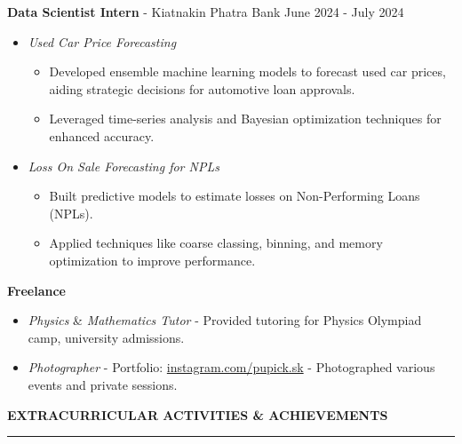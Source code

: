 \documentclass[a4paper, 11pt]{article}
\begin{document}
\textbf{Data Scientist Intern} - Kiatnakin Phatra Bank \hfill June 2024 - July 2024

\begin{itemize}[topsep=0pt, parsep=0pt]
    \item \textit{Used Car Price Forecasting}
    {\fontsize{11pt}{11pt}\selectfont
    \begin{itemize}[noitemsep, topsep=0pt, partopsep=0pt, parsep=0pt, leftmargin=*]
        \item Developed ensemble machine learning models to forecast used car prices, aiding strategic decisions for automotive loan approvals.
        \item Leveraged time-series analysis and Bayesian optimization techniques for enhanced accuracy.
    \end{itemize}
    }
    \item \textit{Loss On Sale Forecasting for NPLs}
    {\fontsize{11pt}{11pt}\selectfont
    \begin{itemize}[noitemsep, topsep=0pt, partopsep=0pt, parsep=0pt, leftmargin=*]
        \item Built predictive models to estimate losses on Non-Performing Loans (NPLs).%
        \item Applied techniques like coarse classing, binning, and memory optimization to improve performance.
    \end{itemize}
    }
\end{itemize}

\textbf{Freelance}
\begin{itemize}[noitemsep, topsep=0pt, partopsep=0pt, parsep=0pt]
    \item \textit{Physics} \& \textit{Mathematics Tutor} - Provided tutoring for Physics Olympiad camp, university admissions.
    \item \textit{Photographer} - Portfolio: \href{https://www.instagram.com/pupick.sk/}{instagram.com/pupick.sk} - Photographed various events and private sessions.
\end{itemize}

\vspace{6pt}
\textbf{EXTRACURRICULAR ACTIVITIES \& ACHIEVEMENTS}
\vspace{5pt}
{\color{NavyBlue}\hrule}
\vspace{6pt}
\end{document}
